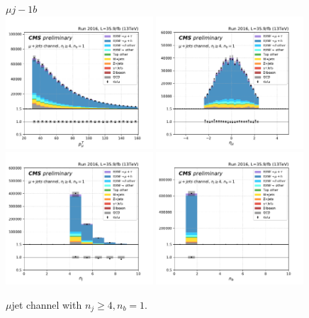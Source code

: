 \begin{figure}[ht]
    \centering
    $\mu j- 1b$ \\
    \includegraphics[width=0.49\textwidth]{chapters/Analysis/sectionPlots/figures/kinematics_pickles/mu4j/1b/mu4j_1b_lepton1_pt.pdf}
    \includegraphics[width=0.49\textwidth]{chapters/Analysis/sectionPlots/figures/kinematics_pickles/mu4j/1b/mu4j_1b_lepton1_eta.pdf}
    \includegraphics[width=0.49\textwidth]{chapters/Analysis/sectionPlots/figures/kinematics_pickles/mu4j/1b/mu4j_1b_nJets.pdf}
    \includegraphics[width=0.49\textwidth]{chapters/Analysis/sectionPlots/figures/kinematics_pickles/mu4j/1b/mu4j_1b_nBJets.pdf}
    
    \caption{$\mu$jet channel with $n_j\geq4, n_b=1$.}
\end{figure}

